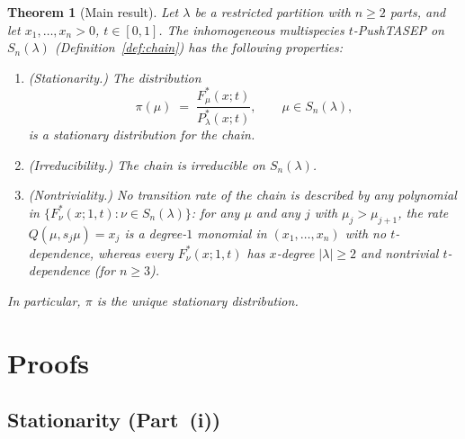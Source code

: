 \documentclass[12pt]{article}
\newtheorem{theorem}{Theorem}
\theoremstyle{definition}
\begin{document}
\begin{theorem}[Main result]
\label{thm:main}
Let $\lambda$ be a restricted partition with $n \geq 2$ parts, and let
$x_1,\dots,x_n > 0$, $t \in [0,1]$.  The inhomogeneous multispecies
$t$-PushTASEP on $S_n(\lambda)$ \emph{(Definition~\ref{def:chain})} has
the following properties:
\begin{enumerate}[label=\emph{(\roman*)}]
\item \emph{(Stationarity.)}
  The distribution
  \[
    \pi(\mu) \;=\; \frac{F^*_\mu(x;t)}{P^*_\lambda(x;t)},
    \qquad \mu \in S_n(\lambda),
  \]
  is a stationary distribution for the chain.
\item \emph{(Irreducibility.)}
  The chain is irreducible on $S_n(\lambda)$.
\item \emph{(Nontriviality.)}
  No transition rate of the chain is described by any polynomial in
  $\{F^*_\nu(x;1,t) : \nu \in S_n(\lambda)\}$:
  for any $\mu$ and any $j$ with $\mu_j > \mu_{j+1}$, the rate
  $Q(\mu,s_j\mu) = x_j$ is a degree-$1$ monomial in $(x_1,\dots,x_n)$
  with no $t$-dependence, whereas every $F^*_\nu(x;1,t)$ has
  $x$-degree $|\lambda| \geq 2$ and nontrivial $t$-dependence (for $n \geq 3$).
\end{enumerate}
In particular, $\pi$ is the \emph{unique} stationary distribution.
\end{theorem}

\section{Proofs}

\subsection{Stationarity (Part~(i))}
\end{document}
